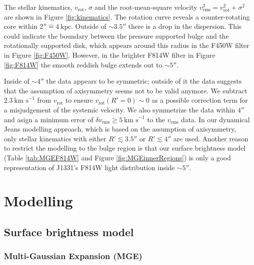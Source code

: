 \documentclass[useAMS,usenatbib]{mnras}
\begin{document}
The stellar kinematics, $v_\text{rot}$, $\sigma$ and the root-mean-square velocity $v_\text{rms}^2=v_\text{rot}^2 + \sigma^2$ are shown in Figure \ref{fig:kinematics}. The rotation curve reveals a counter-rotating core within $2''\hat{=}4~\text{kpc}$. Outside of $\sim 3.5''$ there is a drop in the dispersion. This could indicate the boundary between the pressure supported bulge and the rotationally supported disk, which appears around this radius in the F450W filter in Figure \ref{fig:F450W}. However, in the brighter F814W filter in Figure \ref{fig:F814W} the smooth reddish bulge extends out to $\sim5''$. 

Inside of $\sim 4''$ the data appears to be symmetric; outside of it the data suggests that the assumption of axisymmetry seems not to be valid anymore. We subtract $2.3~\text{km s}^{-1}$ from $v_\text{rot}$ to ensure $v_\text{rot}(R'=0) \sim 0$ as a possible correction term for a misjudgement of the systemic velocity. We also symmetrize the data within $4''$ and asign a minimum error of $\delta v_\text{rms} \geq 5~\text{km s}^{-1}$ to the $v_\text{rms}$ data. In our dynamical Jeans modelling approach, which is based on the assumption of axisymmetry, only stellar kinematics with either $R'  \lesssim 3.5''$ or $R' \lesssim 4''$ are used. Another reason to restrict the modelling to the bulge region is that our surface brightness model (Table \ref{tab:MGEF814W} and Figure \ref{fig:MGEinnerRegions}) is only a good representation of J1331's F814W light distribution inside $\sim 5''$.

\section{Modelling} \label{sec:Modelling}

\subsection{Surface brightness model} \label{sec:MGE_theo}

\subsubsection{Multi-Gaussian Expansion (MGE)}
\end{document}
